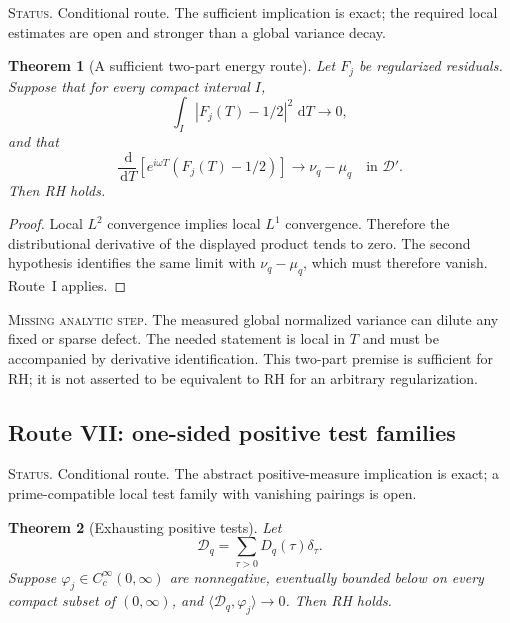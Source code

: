 \documentclass[11pt]{amsart}
\numberwithin{equation}{section}
\theoremstyle{plain}
\newtheorem{theorem}{Theorem}[section]
\theoremstyle{definition}
\theoremstyle{remark}
\newcommand{\1}{\mathbf{1}}
\newcommand{\dd}{\,\mathrm{d}}
\newcommand{\statusnote}[1]{%
  \par\smallskip\noindent
  \begingroup\footnotesize\textsc{Status.} #1\endgroup
  \par\smallskip}
\newcommand{\missingnote}[1]{%
  \par\smallskip\noindent
  \begingroup\footnotesize\textsc{Missing analytic step.} #1\endgroup
  \par\smallskip}
\begin{document}
\statusnote{Conditional route.  The sufficient implication is exact; the required local estimates are open and stronger than a global variance decay.}
\begin{theorem}[A sufficient two-part energy route]
\label{thm:energy_local_route}
Let $F_j$ be regularized residuals.  Suppose that for every compact interval
$I$,
\begin{equation}
\int_I|F_j(T)-1/2|^2\,\dd T\longrightarrow0,
\label{eq:energy_route_local_L2}
\end{equation}
and that
\begin{equation}
\frac{\dd}{\dd T}
\left[e^{i\omega T}(F_j(T)-1/2)\right]
\longrightarrow
\nu_q-\mu_q
\quad\text{in }\mathcal D'.
\label{eq:energy_route_derivative}
\end{equation}
Then RH holds.
\end{theorem}

\begin{proof}
Local $L^2$ convergence implies local $L^1$ convergence.  Therefore the
distributional derivative of the displayed product tends to zero.  The
second hypothesis identifies the same limit with $\nu_q-\mu_q$, which must
therefore vanish.  Route~I applies.
\end{proof}

\missingnote{The measured global normalized variance can dilute any fixed or
sparse defect.  The needed statement is local in $T$ and must be accompanied
by derivative identification.  This two-part premise is sufficient for RH;
it is not asserted to be equivalent to RH for an arbitrary regularization.}

\subsection{Route VII: one-sided positive test families}
\label{subsec:route_positive_tests}

\statusnote{Conditional route.  The abstract positive-measure implication is exact; a prime-compatible local test family with vanishing pairings is open.}
\begin{theorem}[Exhausting positive tests]
\label{thm:exhausting_positive_tests}
Let
\begin{equation}
\mathcal D_q=\sum_{\tau>0}D_q(\tau)\delta_\tau.
\label{eq:positive_defect_measure_route}
\end{equation}
Suppose $\varphi_j\in C_c^\infty(0,\infty)$ are nonnegative, eventually
bounded below on every compact subset of $(0,\infty)$, and
$\langle\mathcal D_q,\varphi_j\rangle\to0$.  Then RH holds.
\end{theorem}
\end{document}
